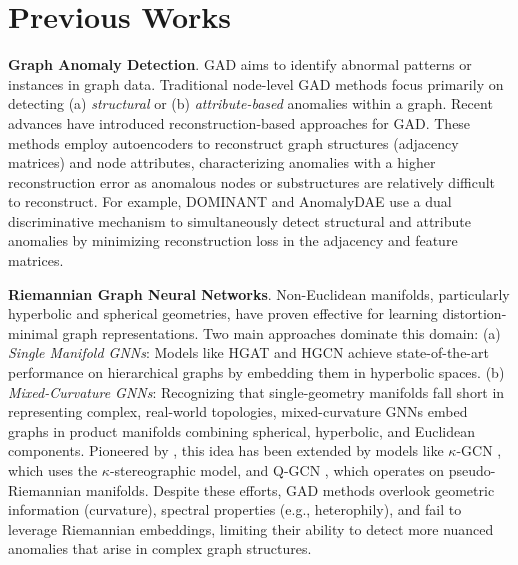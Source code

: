 \section{Previous Works}
\textbf{Graph Anomaly Detection}. GAD aims to identify abnormal patterns or instances in graph data. Traditional node-level GAD methods focus primarily on detecting (a) \textit{structural} or (b) \textit{attribute-based} anomalies within a graph. Recent advances have introduced reconstruction-based approaches for GAD. These methods employ autoencoders to reconstruct graph structures (adjacency matrices) and node attributes, characterizing anomalies with a higher reconstruction error as anomalous nodes or substructures are relatively difficult to reconstruct. For example, DOMINANT \citep{ding2019deep} and AnomalyDAE \cite{fan2020anomalydae} use a dual discriminative mechanism to simultaneously detect structural and attribute anomalies by minimizing reconstruction loss in the adjacency and feature matrices. 

\textbf{Riemannian Graph Neural Networks}. Non-Euclidean manifolds, particularly hyperbolic \citep{sala2018representation} and spherical \citep{liu2017sphereface} geometries, have proven effective for learning distortion-minimal graph representations. 
Two main approaches dominate this domain: (a) \textit{Single Manifold GNNs}: Models like HGAT \citep{zhang2021hyperbolic} and HGCN \citep{chami2019hyperbolic} achieve state-of-the-art performance on hierarchical graphs by embedding them in hyperbolic spaces. (b) \textit{Mixed-Curvature GNNs}: Recognizing that single-geometry manifolds fall short in representing complex, real-world topologies, mixed-curvature GNNs embed graphs in product manifolds combining spherical, hyperbolic, and Euclidean components. Pioneered by \cite{gu2019learning}, this idea has been extended by models like $\kappa$-GCN \citep{bachmann2020constant}, which uses the $\kappa$-stereographic model, and Q-GCN \citep{xiong2022pseudo}, which operates on pseudo-Riemannian manifolds. Despite these efforts, GAD methods overlook geometric information (curvature), spectral properties (e.g., heterophily), and fail to leverage Riemannian embeddings, limiting their ability to detect more nuanced anomalies that arise in complex graph structures.
